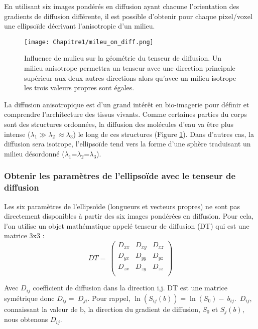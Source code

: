 En utilisant six images pondérés en diffusion ayant chacune l’orientation des gradients de diffusion différente, il est possible d’obtenir pour chaque pixel/voxel une ellipsoïde décrivant l’anisotropie d’un milieu.
\begin{figure}[!htbp]
  \begin{center}
    \texttt{[image: Chapitre1/mileu\_on\_diff.png]}
     \end{center}
    \caption{Influence de mulieu sur la géométrie du tenseur de diffusion. Un milieu anisotrope permettra un tenseur avec une direction principale supérieur aux deux autres directions alors qu'avec un milieu isotrope les trois valeurs propres sont égales.}
  \label{fig:diff_avec_milieu}
\end{figure}
La diffusion anisotropique est d’un grand intérêt en bio-imagerie pour définir et comprendre l’architecture des tissus vivants. Comme certaines parties du corps sont des structures ordonnées, la diffusion des molécules d’eau va être plus intense ($\lambda_1\gg\lambda_2\ \approx\lambda_3$) le long de ces structures (Figure \ref{fig:diff_avec_milieu}). Dans d’autres cas, la diffusion sera isotrope, l’ellipsoïde tend vers la forme d’une sphère traduisant un milieu désordonné ($\lambda_1$=$\lambda_2$=$\lambda_3$).

\clearpage
\subsubsection{Obtenir les paramètres de l’ellipsoïde avec le tenseur de diffusion}

Les six paramètres de l’ellipsoïde (longueurs et vecteurs propres) ne sont pas directement disponibles à partir des six images pondérées en diffusion. Pour cela, l’on utilise un objet mathématique appelé tenseur de diffusion (DT) qui est une matrice 3x3 \cite{Basser1994}:
\begin{equation}
\nonumber
DT=\ \left(\begin{matrix}D_{xx}&D_{xy}&D_{xz}\\D_{yx}&D_{yy}&D_{yz}\\D_{zx}&D_{zy}&D_{zz}\\\end{matrix}\right)
\end{equation}


Avec $D_{ij}$ coefficient de diffusion dans la direction i,j. DT est une matrice symétrique donc $D_{ij}=\ D_{ji}$. Pour rappel, $\ln{\left(S_{ij}\left(b\right)\right)=}\ln{\left(S_0\right)}-\ b_{ij}$.\ $D_{ij}$, connaissant la valeur de b, la direction du gradient de diffusion, $S_0$ et $S_{j}(b)$, nous obtenons $D_{ij}$.


